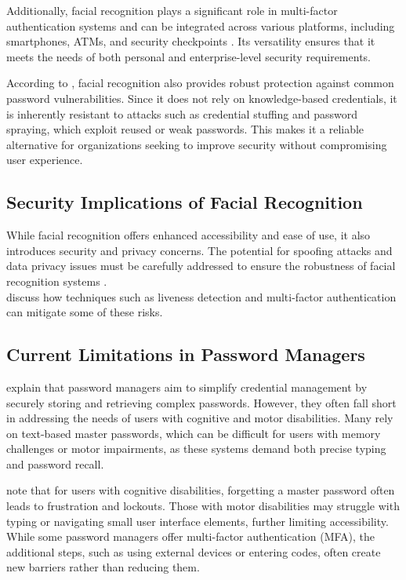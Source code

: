 Additionally, facial recognition plays a significant role in multi-factor authentication systems and can be integrated across various platforms, including smartphones, ATMs, and security checkpoints \autocite{Gorman2003}. Its versatility ensures that it meets the needs of both personal and enterprise-level security requirements.

According to \textcite{Gorman2003}, facial recognition also provides robust protection against common password vulnerabilities. Since it does not rely on knowledge-based credentials, it is inherently resistant to attacks such as credential stuffing and password spraying, which exploit reused or weak passwords. This makes it a reliable alternative for organizations seeking to improve security without compromising user experience.

\subsection{Security Implications of Facial Recognition}
While facial recognition offers enhanced accessibility and ease of use, it also introduces security and privacy concerns. The potential for spoofing attacks and data privacy issues must be carefully addressed to ensure the robustness of facial recognition systems \autocite{Bowyer2006,Bahia2024}. \\

\textcite{Kuznetsov2024} discuss how techniques such as liveness detection and multi-factor authentication can mitigate some of these risks.

\subsection{Current Limitations in Password Managers}

\textcite{Ophoff2021} explain that password managers aim to simplify credential management by securely storing and retrieving complex passwords. However, they often fall short in addressing the needs of users with cognitive and motor disabilities. Many rely on text-based master passwords, which can be difficult for users with memory challenges or motor impairments, as these systems demand both precise typing and password recall.

\textcite{IALabs2024} note that for users with cognitive disabilities, forgetting a master password often leads to frustration and lockouts. Those with motor disabilities may struggle with typing or navigating small user interface elements, further limiting accessibility. While some password managers offer multi-factor authentication (MFA), the additional steps, such as using external devices or entering codes, often create new barriers rather than reducing them.

